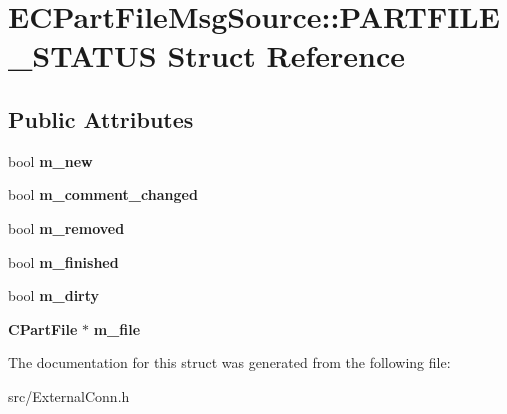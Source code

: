 \section{ECPartFileMsgSource::PARTFILE\_\-STATUS Struct Reference}
\label{structECPartFileMsgSource_1_1PARTFILE__STATUS}
\subsection*{Public Attributes}
\begin{DoxyCompactItemize}
\item 
bool {\bfseries m\_\-new}\label{structECPartFileMsgSource_1_1PARTFILE__STATUS_a6eb96739ca261d328447d310a39282d0}

\item 
bool {\bfseries m\_\-comment\_\-changed}\label{structECPartFileMsgSource_1_1PARTFILE__STATUS_a69f78c400a6c892be15f8699e2f9b418}

\item 
bool {\bfseries m\_\-removed}\label{structECPartFileMsgSource_1_1PARTFILE__STATUS_a04aa9dd9f375920803cd72e816923d03}

\item 
bool {\bfseries m\_\-finished}\label{structECPartFileMsgSource_1_1PARTFILE__STATUS_af70608a498c166816ea5eab9f7ac4dc2}

\item 
bool {\bfseries m\_\-dirty}\label{structECPartFileMsgSource_1_1PARTFILE__STATUS_a06c36ee35ad6edb4c60b0513e3f6da18}

\item 
{\bf CPartFile} $\ast$ {\bfseries m\_\-file}\label{structECPartFileMsgSource_1_1PARTFILE__STATUS_a90cb83e48b2a6b170685ac54d7f87678}

\end{DoxyCompactItemize}


The documentation for this struct was generated from the following file:\begin{DoxyCompactItemize}
\item 
src/ExternalConn.h\end{DoxyCompactItemize}
